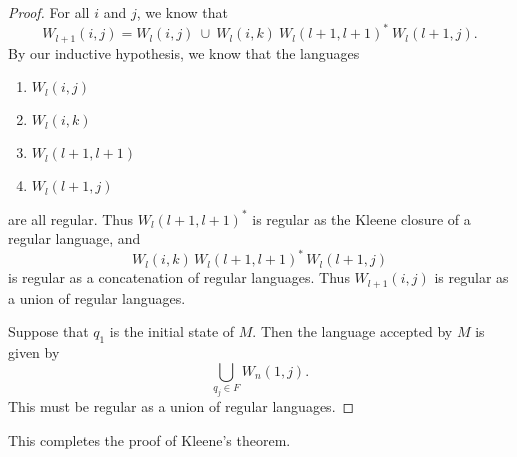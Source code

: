 \documentclass{bcthesis}
\begin{document}
\begin{proof}
		For all $i$ and $j$, we know that 
		\[
			W_{l+1}(i, j) = W_l(i, j) \ \cup \ W_l(i, k)\ W_l(l+1, l+1)^* \ W_l(l+1, j).
		\]
		By our inductive hypothesis, we know that the languages 
		\begin{enumerate}[label = (\roman*), itemsep = -0.3 ex, nolistsep]
			\item $W_l(i, j)$
			\item $W_l(i, k)$
			\item $W_l(l+1, l+1)$
			\item $W_l(l+1, j)$
		\end{enumerate}
		are all regular.
		Thus $W_l(l+1, l+1)^*$ is regular as the Kleene closure of a regular language, and 
		\[
			W_l(i, k)\, W_l(l+1, l+1)^*\, W_l(l+1, j)
		\] 
		is regular as a concatenation of regular languages.
		Thus $W_{l+1}(i, j)$ is regular as a union of regular languages.

		Suppose that $q_1$ is the initial state of $M$.
		Then the language accepted by $M$ is given by
		\[
			\bigcup_{q_j \in F} W_n(1, j).
		\]
		This must be regular as a union of regular languages.
	\end{proof}
	

	This completes the proof of Kleene's theorem.



\label{sec:examples}
\end{document}
